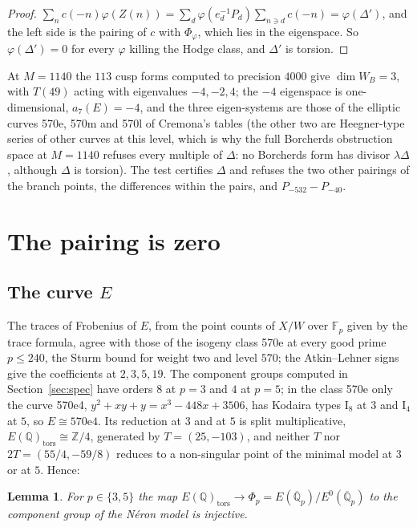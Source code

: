 \documentclass[11pt,reqno]{amsart}
\theoremstyle{plain}
\newtheorem{lemma}[theorem]{Lemma}
\theoremstyle{definition}
\newcommand{\Q}{\mathbb{Q}}
\newcommand{\Z}{\mathbb{Z}}
\newcommand{\F}{\mathbb{F}}
\begin{document}
\begin{proof}
$\sum_nc(-n)\varphi(Z(n))=\sum_d\varphi(e_d^{-1}P_d)\sum_{n\ni d}c(-n)=\varphi(\Delta')$, and the left side is
the pairing of $c$ with $\Phi_\varphi$, which lies in the eigenspace. So $\varphi(\Delta')=0$ for every
$\varphi$ killing the Hodge class, and $\Delta'$ is torsion.
\end{proof}

At $M=1140$ the $113$ cusp forms computed to precision $4000$ give $\dim W_B=3$, with $T(49)$ acting with
eigenvalues $-4,-2,4$; the $-4$ eigenspace is one-dimensional, $a_7(E)=-4$, and the three eigen-systems
are those of the elliptic curves 570e, 570m and 570l of Cremona's tables (the other two are Heegner-type
series of other curves at this level, which is why the full Borcherds obstruction space at $M=1140$ refuses
every multiple of $\Delta$: no Borcherds form has divisor $\lambda\Delta$, although $\Delta$ is torsion).
The test certifies $\Delta$ and refuses the two other pairings of the branch points, the differences within
the pairs, and $P_{-532}-P_{-40}$.

\section{The pairing is zero}\label{sec:torsionpart}

\subsection{The curve $E$}
The traces of Frobenius of $E$, from the point counts of $X/W$ over $\F_p$ given by the trace formula, agree
with those of the isogeny class 570e at every good prime $p\le240$, the Sturm bound for weight two and level
$570$; the Atkin--Lehner signs give the coefficients at $2,3,5,19$. The component groups computed in
Section~\ref{sec:spec} have orders $8$ at $p=3$ and $4$ at $p=5$; in the class 570e only the curve
570e4, $y^2+xy+y=x^3-448x+3506$, has Kodaira types $\mathrm{I}_8$ at $3$ and $\mathrm{I}_4$ at $5$, so
$E\cong 570\mathrm{e}4$. Its reduction at $3$ and at $5$ is split multiplicative, $E(\Q)_{\mathrm{tors}}\cong\Z/4$,
generated by $T=(25,-103)$, and neither $T$ nor $2T=(55/4,-59/8)$ reduces to a non-singular point of the
minimal model at $3$ or at $5$. Hence:

\begin{lemma}\label{lem:inj}
For $p\in\{3,5\}$ the map $E(\Q)_{\mathrm{tors}}\to\Phi_p=E(\overline{\Q}_p)/E^0(\overline{\Q}_p)$ to the
component group of the N\'eron model is injective.
\end{lemma}
\end{document}
